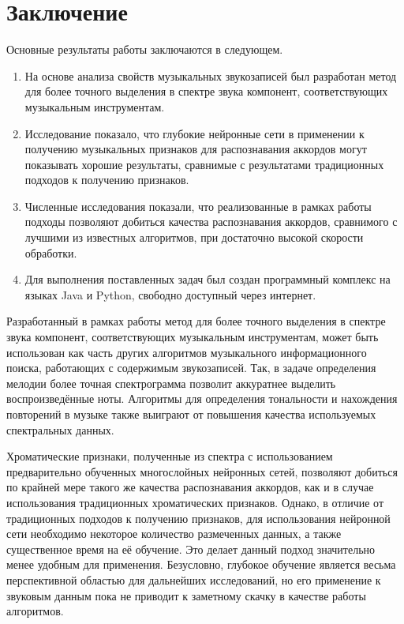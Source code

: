\chapter*{Заключение}						%
\label{chaptC}

Основные результаты работы заключаются в следующем.
\begin{enumerate}
  \item На основе анализа свойств музыкальных звукозаписей был разработан метод
  для более точного выделения в спектре звука компонент, соответствующих
  музыкальным инструментам.
  \item Исследование показало, что глубокие нейронные сети в применении к
  получению музыкальных признаков для распознавания аккордов могут показывать
  хорошие результаты, сравнимые с результатами традиционных подходов к
  получению признаков.
  \item Численные исследования показали, что реализованные в рамках работы
  подходы позволяют добиться качества распознавания аккордов, сравнимого с
  лучшими из известных алгоритмов, при достаточно высокой скорости обработки.
  \item Для выполнения поставленных задач был создан программный комплекс на
  языках Java и Python, свободно доступный через интернет.
\end{enumerate}

Разработанный в рамках работы метод для более точного выделения в спектре звука
компонент, соответствующих музыкальным инструментам, может быть использован как
часть других алгоритмов музыкального информационного поиска, работающих с
содержимым звукозаписей. Так, в задаче определения мелодии более точная
спектрограмма позволит аккуратнее выделить воспроизведённые ноты. Алгоритмы для
определения тональности и нахождения повторений в музыке также выиграют от
повышения качества используемых спектральных данных.

Хроматические признаки, полученные из спектра с использованием предварительно
обученных многослойных нейронных сетей, позволяют добиться по крайней мере
такого же качества распознавания аккордов, как и в случае использования
традиционных хроматических признаков. Однако, в отличие от традиционных подходов
к получению признаков, для использования нейронной сети необходимо некоторое
количество размеченных данных, а также существенное время на её обучение. Это
делает данный подход значительно менее удобным для применения. Безусловно,
глубокое обучение является весьма перспективной областью для дальнейших
исследований, но его применение к звуковым данным пока не приводит к заметному
скачку в качестве работы алгоритмов.

